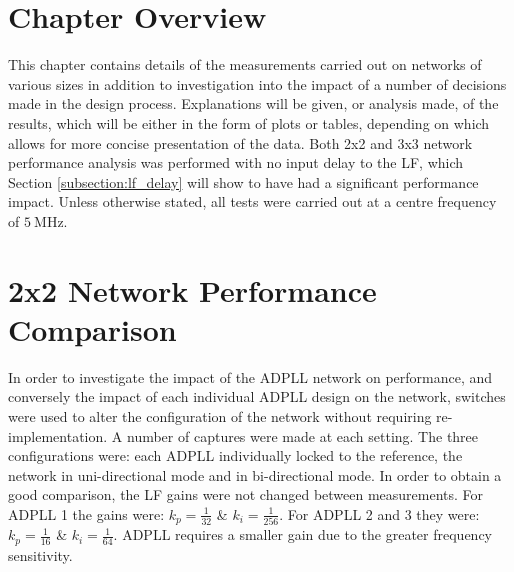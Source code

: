 \section{Chapter Overview}
This chapter contains details of the measurements carried out on networks of various sizes in addition to investigation into the impact of a number of decisions made in the design process. Explanations will be given, or analysis made, of the results, which will be either in the form of plots or tables, depending on which allows for more concise presentation of the data. Both 2x2 and 3x3 network performance analysis was performed with no input delay to the \ac{LF}, which Section \ref{subsection:lf_delay} will show to have had a significant performance impact. Unless otherwise stated, all tests were carried out at a centre frequency of $5~\si{\mega\hertz}$.

\section{2x2 Network Performance Comparison}
In order to investigate the impact of the \ac{ADPLL} network on performance, and conversely the impact of each individual \ac{ADPLL} design on the network, switches were used to alter the configuration of the network without requiring re-implementation. A number of captures were made at each setting. The three configurations were: each \ac{ADPLL} individually locked to the reference, the network in uni-directional mode and in bi-directional mode. In order to obtain a good comparison, the \ac{LF} gains were not changed between measurements. For \ac{ADPLL} 1 the gains were: $k_p = \frac{1}{32}$ \& $k_i = \frac{1}{256}$. For \ac{ADPLL} 2 and 3 they were: $k_p = \frac{1}{16}$ \& $k_i = \frac{1}{64}$. \ac{ADPLL} requires a smaller gain due to the greater frequency sensitivity.

